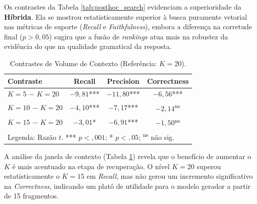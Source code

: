 Os contrastes da Tabela \ref{tab:posthoc_search} evidenciam a superioridade da \textbf{Híbrida}. Ela se mostrou estatisticamente superior à busca puramente vetorial nas métricas de suporte (\textit{Recall} e \textit{Faithfulness}), embora a diferença na corretude final ($p > 0,05$) sugira que a fusão de \textit{rankings} atua mais na robustez da evidência do que na qualidade gramatical da resposta.


\begin{table}[ht!]
  \centering
  \caption{Contrastes de Volume de Contexto (Referência: $K=20$).}
  \label{tab:posthoc_topk}
  \small
  \begin{tabular}{@{}lccc@{}}
    \toprule
    \textbf{Contraste} & \textbf{Recall} & \textbf{Precision} & \textbf{Correctness} \\ \midrule
    $K=5$ $-$ $K=20$  & $-9,81$*** & $-11,80$*** & $-6,56$*** \\
    $K=10$ $-$ $K=20$ & $-4,10$*** & $-7,17$*** & $-2,14$\textsuperscript{ns} \\
    $K=15$ $-$ $K=20$ & $-3,01$* & $-6,91$*** & $-1,50$\textsuperscript{ns} \\ \bottomrule
    \multicolumn{4}{l}{\footnotesize Legenda: Razão $t$. *** $p < ,001$; * $p < ,05$; \textsuperscript{ns} não sig.}
  \end{tabular}
\end{table}


A análise da janela de contexto (Tabela \ref{tab:posthoc_topk}) revela que o benefício de aumentar o $K$ é mais acentuado na etapa de recuperação. O nível $K=20$ superou estatisticamente o $K=15$ em \textit{Recall}, mas não gerou um incremento significativo na \textit{Correctness}, indicando um platô de utilidade para o modelo gerador a partir de 15 fragmentos.
